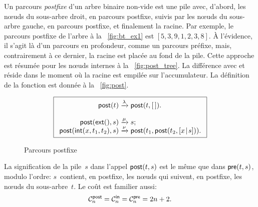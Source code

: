 Un parcours \emph{postfixe} d'un arbre
binaire non-vide est une pile avec, d'abord, les nœuds du
sous-arbre droit, en parcours postfixe, suivis par les nœuds du
sous-arbre gauche, en parcours postfixe, et finalement la racine. Par
exemple, le parcours postfixe de l'arbre à la \fig~\vref{fig:bt_ex1}
est \([5,3,9,1,2,3,8]\). À l'évidence, il s'agit là d'un parcours en
profondeur, comme un
parcours préfixe, mais, contrairement à ce dernier, la racine est
placée au fond de la pile. Cette approche est résumée pour les
nœuds internes à la \fig~\vref{fig:post_tree}. La différence avec
 et 
réside dans le moment où la racine est empilée sur l'accumulateur. La
définition de la fonction est donnée à la \fig~\vref{fig:post}.
\begin{figure}
\begin{equation*}
\boxed{
\begin{array}{r@{\;}c@{\;}l}
\fun{post}(t) & \xrightarrow{\lambda} & \fun{post}(t,\el).\\
\\
\fun{post}(\fun{ext}(),s) & \xrightarrow{\smash{\mu}} & s;\\
\fun{post}(\fun{int}(x,t_1,t_2),s)
  & \xrightarrow{\smash{\nu}}
  & \fun{post}(t_1,\fun{post}(t_2,\cons{x}{s})).
\end{array}}
\end{equation*}
\caption{Parcours postfixe}
\label{fig:post}
\end{figure}
La signification de la pile~\(s\) dans l'appel
\(\textsf{post}(t,s)\)
est le même que dans \(\textsf{pre}(t,s)\), modulo l'ordre:
\(s\)~contient, en postfixe, les nœuds qui suivent, en postfixe,
les nœuds du sous-arbre~\(t\). Le coût est familier aussi:
\begin{equation*}
  \C{\fun{post}}{n} = \C{\fun{in}}{n} = \C{\fun{pre}}{n} = 2n +
  2.\index{post@$\C{\fun{post}}{n}$}
\end{equation*}

